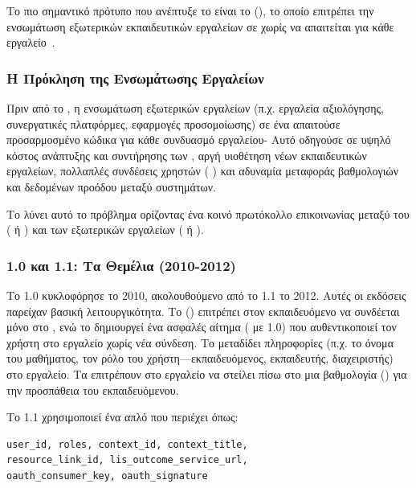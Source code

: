 Το πιο σημαντικό πρότυπο που ανέπτυξε το  είναι το \textit{  } (), το οποίο επιτρέπει την ενσωμάτωση εξωτερικών εκπαιδευτικών εργαλείων σε  χωρίς να απαιτείται   για κάθε εργαλείο~\cite{ims2019overview,cetis2012lti}.

\subsubsection{Η Πρόκληση της Ενσωμάτωσης Εργαλείων}

Πριν από το , η ενσωμάτωση εξωτερικών εργαλείων (π.χ. εργαλεία αξιολόγησης, συνεργατικές πλατφόρμες, εφαρμογές προσομοίωσης) σε ένα  απαιτούσε προσαρμοσμένο κώδικα για κάθε συνδυασμό εργαλείου- Αυτό οδηγούσε σε υψηλό κόστος ανάπτυξης και συντήρησης των , αργή υιοθέτηση νέων εκπαιδευτικών εργαλείων, πολλαπλές συνδέσεις χρηστών ( ) και αδυναμία μεταφοράς βαθμολογιών και δεδομένων προόδου μεταξύ συστημάτων.

Το  λύνει αυτό το πρόβλημα ορίζοντας ένα κοινό πρωτόκολλο επικοινωνίας μεταξύ του  (\textit{ } ή \textit{}) και των εξωτερικών εργαλείων (\textit{ } ή \textit{}).

\subsubsection{ 1.0 και 1.1: Τα Θεμέλια (2010-2012)}

Το  1.0 κυκλοφόρησε το 2010, ακολουθούμενο από το  1.1 το 2012. Αυτές οι εκδόσεις παρείχαν βασική λειτουργικότητα. Το   () επιτρέπει στον εκπαιδευόμενο να συνδέεται μόνο στο , ενώ το  δημιουργεί ένα ασφαλές αίτημα ( με  1.0) που αυθεντικοποιεί τον χρήστη στο εργαλείο χωρίς νέα σύνδεση. Το   μεταδίδει πληροφορίες (π.χ. το όνομα του μαθήματος, τον ρόλο του χρήστη—εκπαιδευόμενος, εκπαιδευτής, διαχειριστής) στο εργαλείο. Τα   επιτρέπουν στο εργαλείο να στείλει πίσω στο  μια βαθμολογία () για την προσπάθεια του εκπαιδευόμενου.

Το  1.1 χρησιμοποιεί ένα απλό   που περιέχει  όπως:

{\selectfont

\begin{verbatim}
user_id, roles, context_id, context_title, 
resource_link_id, lis_outcome_service_url, 
oauth_consumer_key, oauth_signature
\end{verbatim}
}

